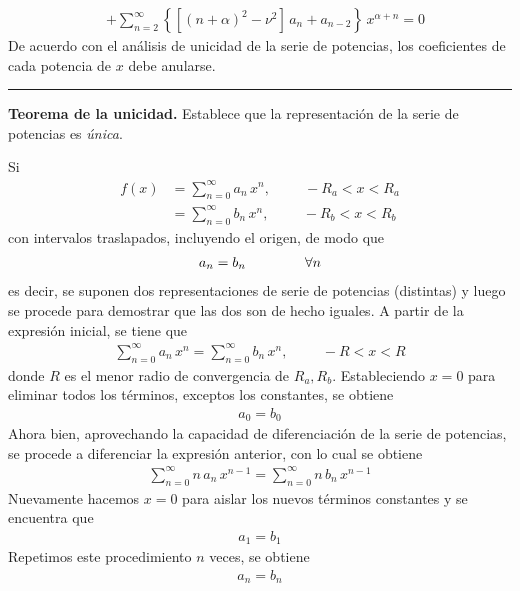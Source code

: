 \begin{enumerate}[label=\textbf{Paso \arabic*}.]
\begin{align*}
&+ \sum_{n=2}^{\infty} \left\{ \left[ (n + \alpha)^{2} - \nu^{2} \right] \, a_{n} + a_{n-2} \right\} \, x^{\alpha + n} = 0
\end{align*}
De acuerdo con el análisis de unicidad de la serie de potencias, los coeficientes de cada potencia de $x$ debe anularse.
\vspace{0.25em}
\hrule
\vspace{0.25em}
\textbf{Teorema de la unicidad. } Establece que la representación de la serie de potencias es \emph{única}.
\par
Si
\begin{align*}
f(x) &= \sum_{n=0}^{\infty} a_{n} \, x^{n}, \hspace{1cm} -R_{a} < x < R_{a} \\[0.5em]
&= \sum_{n=0}^{\infty} b_{n} \, x^{n}, \hspace{1cm} -R_{b} < x < R_{b}
\end{align*}
con intervalos traslapados, incluyendo el origen, de modo que
\begin{align*}
a_{n} = b_{n} \hspace{1.5cm} \forall n
\end{align*}
es decir, se suponen dos representaciones de serie de potencias (distintas) y luego se procede para demostrar que las dos son de hecho iguales.
A partir de la expresión inicial, se tiene que
\begin{align*}
\sum_{n=0}^{\infty} a_{n} \, x^{n} = \sum_{n=0}^{\infty} b_{n} \, x^{n}, \hspace{1cm} -R < x < R
\end{align*}
donde $R$ es el menor radio de convergencia de $R_{a}, R_{b}$. Estableciendo $x=0$ para eliminar todos los términos, exceptos los constantes, se obtiene
\begin{align*}
a_{0} = b_{0}
\end{align*}
Ahora bien, aprovechando la capacidad de diferenciación de la serie de potencias, se procede a diferenciar la expresión anterior, con lo cual se obtiene
\begin{align*}
\sum_{n=0}^{\infty}  n \, a_{n} \, x^{n-1} = \sum_{n=0}^{\infty} n \, b_{n} \, x^{n-1}
\end{align*}
Nuevamente hacemos $x = 0$ para aislar los nuevos términos constantes y se encuentra que
\begin{align*}
a_{1} = b_{1}
\end{align*}
Repetimos este procedimiento $n$ veces, se obtiene
\begin{align*}
a_{n} = b_{n}
\end{align*}

\end{enumerate}
